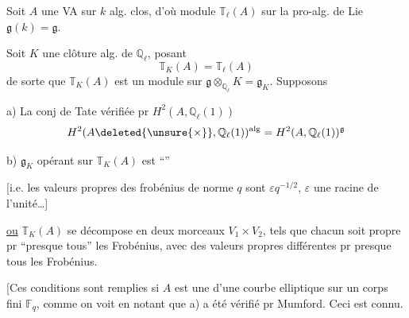 Soit $A$ une VA sur $k$ alg. clos, d'où module $\mathbb{T}_\ell(A)$ \deleted{$\unsure{\otimes}$} sur la pro-alg. de Lie  $\mathfrak{g}(k)=\mathfrak{g}$.

Soit $K$ une clôture alg. de $\mathbb{Q}_\ell$, posant
\[
\mathbb{T}_K(A)=\mathbb{T}_\ell(A)
\]
de sorte que $\mathbb{T}_K(A)$ est un module sur $\mathfrak{g}\otimes_{\mathbb{Q}_\ell}K=\mathfrak{g}_K$. Supposons

a) La  conj de Tate vérifiée pr $H^2(A,\mathbb{Q}_\ell(1))$
\[
H^2(A\deleted{\unsure{\times}},\mathbb{Q}_\ell(1))^{\mathrm{alg}}
=H^2(A,\mathbb{Q}_\ell(1))^{\mathfrak{g}}
\]

b) $\mathfrak{g}_K$ opérant sur  $\mathbb{T}_K(A)$ est ``''

[i.e. les valeurs propres des frobénius  de norme $q$ sont $\varepsilon q^{-1/2}$, $\varepsilon$ une racine de l'unité\ldots]


\uline{ou} $\mathbb{T}_K(A)$ se décompose en deux morceaux $V_1\times V_2$, tels que chacun soit propre pr ``presque tous'' les Frobénius, avec des valeurs propres différentes pr presque tous les Frobénius.

[Ces conditions sont remplies si $A$ est une   d'une  courbe elliptique  sur un corps fini $\mathbb{F}_q$, comme on voit en notant que a)  a été vérifié pr Mumford. Ceci est connu.


